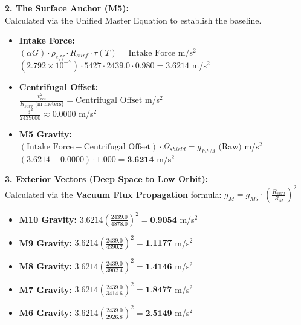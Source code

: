 \documentclass[11pt, a4paper]{article}
\begin{document}
  \vspace{1.0em}
  \noindent \textbf{2. The Surface Anchor (M5):} \\
  \hspace*{1em} Calculated via the Unified Master Equation to establish the baseline.
  \begin{itemize}
    \item \textbf{Intake Force:} \\[0.5em]
    \hspace*{2em} $(\alpha G) \cdot \rho_{eff} \cdot R_{surf} \cdot \tau(T) = \text{Intake Force}$ m/s$^2$ \\[1em]
    \hspace*{2em} $(2.792 \times 10^{-7}) \cdot 5427 \cdot 2439.0 \cdot 0.980 = 3.6214$ m/s$^2$
    
    \item \textbf{Centrifugal Offset:} \\[0.5em]
    \hspace*{2em} $\frac{v_{rot}^2}{R_{surf} \text{ (in meters)}} = \text{Centrifugal Offset}$ m/s$^2$ \\[1em]
    \hspace*{2em} $\frac{3^2}{2439000} \approx 0.0000$ m/s$^2$
    
    \item \textbf{M5 Gravity:} \\[0.5em]
    \hspace*{2em} $(\text{Intake Force} - \text{Centrifugal Offset}) \cdot \Omega_{shield} = g_{EFM} \text{ (Raw)}$ m/s$^2$ \\[1em]
    \hspace*{2em} $(3.6214 - 0.0000) \cdot 1.000 = \textbf{3.6214}$ m/s$^2$
  \end{itemize}

  \clearpage
  \noindent \textbf{3. Exterior Vectors (Deep Space to Low Orbit):} \\
  \hspace*{1em} Calculated via the \textbf{Vacuum Flux Propagation} formula: $g_M = g_{M5} \cdot \left( \frac{R_{surf}}{R_M} \right)^2$
  \begin{itemize}
    \item \textbf{M10 Gravity:} $3.6214 \left( \frac{2439.0}{4878.0} \right)^2 = \textbf{0.9054}$ m/s$^2$
    \item \textbf{M9 Gravity:} $3.6214 \left( \frac{2439.0}{4390.2} \right)^2 = \textbf{1.1177}$ m/s$^2$
    \item \textbf{M8 Gravity:} $3.6214 \left( \frac{2439.0}{3902.4} \right)^2 = \textbf{1.4146}$ m/s$^2$
    \item \textbf{M7 Gravity:} $3.6214 \left( \frac{2439.0}{3414.6} \right)^2 = \textbf{1.8477}$ m/s$^2$
    \item \textbf{M6 Gravity:} $3.6214 \left( \frac{2439.0}{2926.8} \right)^2 = \textbf{2.5149}$ m/s$^2$
  \end{itemize}
\end{document}
